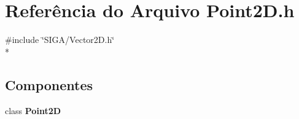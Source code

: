 \section{Referência do Arquivo Point2\+D.\+h}
\label{_point2_d_8h}
{\ttfamily \#include \char`\"{}S\+I\+G\+A/\+Vector2\+D.\+h\char`\"{}}\\*
\subsection*{Componentes}
\begin{DoxyCompactItemize}
\item 
class {\bf Point2D}
\end{DoxyCompactItemize}
